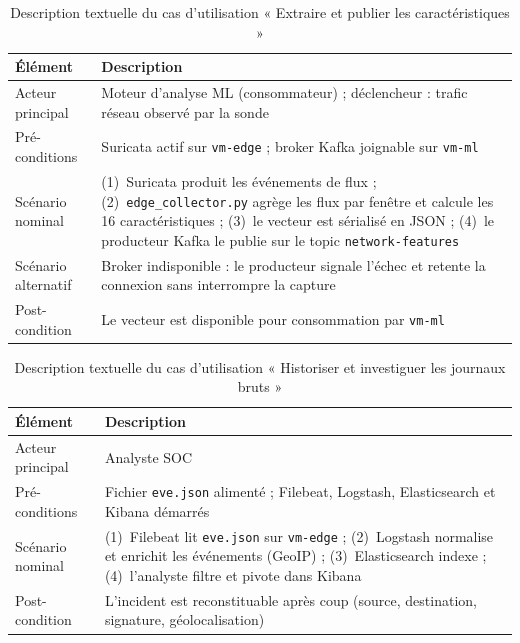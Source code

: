 
\begin{table}[H]
\centering
\caption{Description textuelle du cas d'utilisation « Extraire et publier les caractéristiques »}
\label{tab:uc-s1-features}
\small
\begin{tabularx}{\textwidth}{@{}lX@{}}
\toprule
\textbf{Élément} & \textbf{Description} \\
\midrule
Acteur principal & Moteur d'analyse ML (consommateur) ; déclencheur : trafic réseau observé par la sonde \\
Pré-conditions & Suricata actif sur \texttt{vm-edge} ; broker Kafka joignable sur \texttt{vm-ml} \\
Scénario nominal & (1)~Suricata produit les événements de flux ; (2)~\texttt{edge\_collector.py} agrège les flux par fenêtre et calcule les 16 caractéristiques ; (3)~le vecteur est sérialisé en JSON ; (4)~le producteur Kafka le publie sur le topic \texttt{network-features} \\
Scénario alternatif & Broker indisponible : le producteur signale l'échec et retente la connexion sans interrompre la capture \A{confirmer le comportement réel du producteur} \\
Post-condition & Le vecteur est disponible pour consommation par \texttt{vm-ml} \\
\bottomrule
\end{tabularx}
\end{table}

\begin{table}[H]
\centering
\caption{Description textuelle du cas d'utilisation « Historiser et investiguer les journaux bruts »}
\label{tab:uc-s1-cold}
\small
\begin{tabularx}{\textwidth}{@{}lX@{}}
\toprule
\textbf{Élément} & \textbf{Description} \\
\midrule
Acteur principal & Analyste SOC \\
Pré-conditions & Fichier \texttt{eve.json} alimenté ; Filebeat, Logstash, Elasticsearch et Kibana démarrés \\
Scénario nominal & (1)~Filebeat lit \texttt{eve.json} sur \texttt{vm-edge} ; (2)~Logstash normalise et enrichit les événements (GeoIP) ; (3)~Elasticsearch indexe ; (4)~l'analyste filtre et pivote dans Kibana \\
Post-condition & L'incident est reconstituable après coup (source, destination, signature, géolocalisation) \\
\bottomrule
\end{tabularx}
\end{table}

